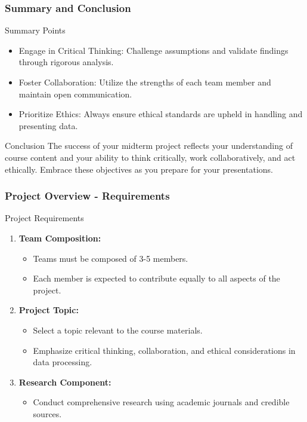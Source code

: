 \documentclass[aspectratio=169]{beamer}
\begin{document}
\begin{frame}[fragile]
    \frametitle{Summary and Conclusion}
    \begin{block}{Summary Points}
        \begin{itemize}
            \item Engage in Critical Thinking: Challenge assumptions and validate findings through rigorous analysis.
            \item Foster Collaboration: Utilize the strengths of each team member and maintain open communication.
            \item Prioritize Ethics: Always ensure ethical standards are upheld in handling and presenting data.
        \end{itemize}
    \end{block}
    
    \begin{block}{Conclusion}
        The success of your midterm project reflects your understanding of course content and your ability to think critically, work collaboratively, and act ethically. Embrace these objectives as you prepare for your presentations.
    \end{block}
\end{frame}

\begin{frame}[fragile]
    \frametitle{Project Overview - Requirements}
    \begin{block}{Project Requirements}
        \begin{enumerate}
            \item \textbf{Team Composition:}
                \begin{itemize}
                    \item Teams must be composed of 3-5 members.
                    \item Each member is expected to contribute equally to all aspects of the project.
                \end{itemize}
                
            \item \textbf{Project Topic:}
                \begin{itemize}
                    \item Select a topic relevant to the course materials.
                    \item Emphasize critical thinking, collaboration, and ethical considerations in data processing.
                \end{itemize}

            \item \textbf{Research Component:}
                \begin{itemize}
                    \item Conduct comprehensive research using academic journals and credible sources.
                \end{itemize}
        \end{enumerate}
    \end{block}
\end{frame}
\end{document}
